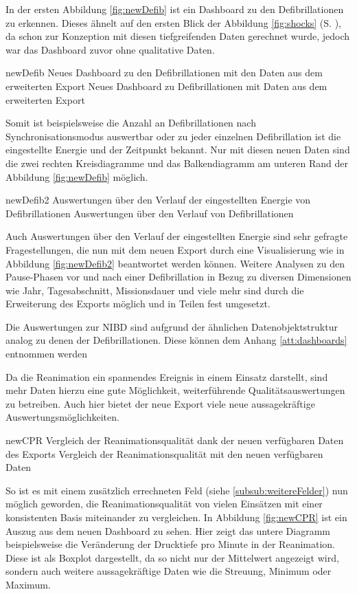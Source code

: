 In der ersten Abbildung \ref{fig:newDefib} ist ein Dashboard zu den Defibrillationen zu erkennen.
Dieses ähnelt auf den ersten Blick der Abbildung \ref{fig:shocks} (S. \pageref{fig:shocks}), da schon zur Konzeption mit diesen tiefgreifenden Daten gerechnet wurde, jedoch war das Dashboard zuvor ohne qualitative Daten.

\bildbreit
{newDefib}
{Neues Dashboard zu den Defibrillationen mit den Daten aus dem erweiterten Export}
{Neues Dashboard zu Defibrillationen mit Daten aus dem erweiterten Export}

Somit ist beispielsweise die Anzahl an Defibrillationen nach Synchronisationsmodus auswertbar oder zu jeder einzelnen Defibrillation ist die eingestellte Energie und der Zeitpunkt bekannt.
Nur mit diesen neuen Daten sind die zwei rechten Kreisdiagramme und das Balkendiagramm am unteren Rand der Abbildung \ref{fig:newDefib} möglich.

\bildbreit
{newDefib2}
{Auswertungen über den Verlauf der eingestellten Energie von Defibrillationen}
{Auswertungen über den Verlauf von Defibrillationen}

Auch Auswertungen über den Verlauf der eingestellten Energie sind sehr gefragte Fragestellungen, die nun mit dem neuen Export durch eine Visualisierung wie in Abbildung \ref{fig:newDefib2} beantwortet werden können.
Weitere Analysen zu den Pause-Phasen vor und nach einer Defibrillation in Bezug zu diversen Dimensionen wie Jahr, Tagesabschnitt, Missionsdauer und viele mehr sind durch die Erweiterung des Exports möglich und in Teilen fest umgesetzt.

Die Auswertungen zur \gls{NIBD} sind aufgrund der ähnlichen Datenobjektstruktur analog zu denen der Defibrillationen. Diese können dem Anhang \ref{att:dashboards} entnommen werden

Da die Reanimation ein spannendes Ereignis in einem Einsatz darstellt, sind mehr Daten hierzu eine gute Möglichkeit, weiterführende Qualitätsauswertungen zu betreiben.
Auch hier bietet der neue Export viele neue aussagekräftige Auswertungsmöglichkeiten.

\bildbreit
{newCPR}
{Vergleich der Reanimationsqualität dank der neuen verfügbaren Daten des Exports}
{Vergleich der Reanimationsqualität mit den neuen verfügbaren Daten}

So ist es mit einem zusätzlich errechneten Feld (siehe \ref{subsub:weitereFelder}) nun möglich geworden, die Reanimationsqualität von vielen Einsätzen mit einer konsistenten Basis miteinander zu vergleichen.
In Abbildung \ref{fig:newCPR} ist ein Auszug aus dem neuen Dashboard zu sehen.
Hier zeigt das untere Diagramm beispielsweise die Veränderung der Drucktiefe pro Minute in der Reanimation.
Diese ist als Boxplot dargestellt, da so nicht nur der Mittelwert angezeigt wird, sondern auch weitere aussagekräftige Daten wie die Streuung, Minimum oder Maximum.

